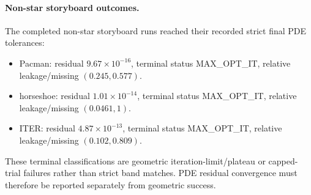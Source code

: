 \paragraph{Non-star storyboard outcomes.} The completed non-star storyboard runs reached their recorded strict final PDE tolerances:
\begin{itemize}\setlength{\itemsep}{0pt}\setlength{\parskip}{0pt}
\item Pacman: residual \(9.67\times 10^{-16}\), terminal status MAX\_OPT\_IT, relative leakage/missing \((0.245,0.577)\).
\item horseshoe: residual \(1.01\times 10^{-14}\), terminal status MAX\_OPT\_IT, relative leakage/missing \((0.0461,1)\).
\item ITER: residual \(4.87\times 10^{-13}\), terminal status MAX\_OPT\_IT, relative leakage/missing \((0.102,0.809)\).
\end{itemize}
These terminal classifications are geometric iteration-limit/plateau or capped-trial failures rather than strict band matches.  PDE residual convergence must therefore be reported separately from geometric success.
